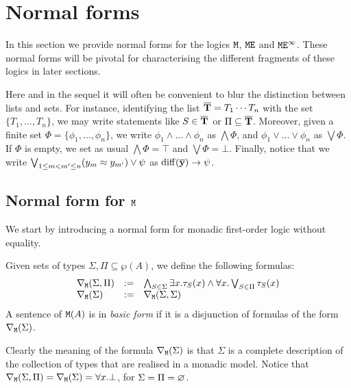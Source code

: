 
\section{Normal forms}
\label{sec:normalforms}

In this section we provide normal forms for the logics $\mathtt{M}$, $\mathtt{M}\mathtt{E}$ and 
$\mathtt{M}\mathtt{E}^{\infty}$. 
These normal forms will be pivotal for characterising the different fragments of 
these logics in later sections.
\begin{convention}
Here and in the sequel it will often be convenient to blur the distinction 
between lists and sets.
For instance, identifying the list $\overline{{\mathbf{T}}} = T_{1}\cdots T_{n}$ with the
set $\{ T_{1}, \ldots, T_{n} \}$, we may write statements like $S \in \overline{{\mathbf{T}}}$ 
or $\Pi \subseteq \overline{{\mathbf{T}}}$. 
Moreover, given a finite set $\Phi = \{\phi_1, \dots, \phi_n\}$, we write $\phi_1 \land \dots \land \phi_n$ as $\bigwedge \Phi$, and $\phi_1 \lor \dots \lor \phi_n$ as $\bigvee \Phi$. If $\Phi$ is empty, we set as usual $\bigwedge \Phi = \top$ and $\bigvee \Phi = \bot$.
Finally, notice that we write $\bigvee_{1\leq m < m^{\prime} \leq n} (y_m \approx y_{m^{\prime}}) \lor \psi$ as $\mathrm{diff}(\overline{{\mathbf{y}}}) \to \psi$. 
\end{convention}


\subsection{Normal form for $\mathtt{M}$}

We start by introducing a normal form for monadic first-order logic without 
equality.

\begin{definition}\label{def:bfofo}
Given sets of types $\Sigma, \Pi \subseteq \wp(A)$, we define the following 
formulas:
\[\begin{array}{lll}
   \nabla_{\mathtt{M}}(\Sigma,\Pi) &\mathrel{:=}&
   \bigwedge_{S\in\Sigma} \exists x. \tau_S(x) \land 
   \forall x. \bigvee_{S\in\Pi} \tau_S(x)
\\ \nabla_{\mathtt{M}}(\Sigma)      &\mathrel{:=}& \nabla_{\mathtt{M}}(\Sigma,\Sigma)
\end{array}\]
A sentence of $\mathtt{M}(A)$ is in \emph{basic form} if it is 
a disjunction of formulas of the form $\nabla_{\mathtt{M}}(\Sigma)$.
\end{definition}

Clearly the meaning of the formula $\nabla_{\mathtt{M}}(\Sigma)$ is that $\Sigma$ is a 
complete description of the collection of types that are realised in a monadic 
model. 
Notice that $  \nabla_{\mathtt{M}}(\Sigma,\Pi) = \nabla_{\mathtt{M}}(\Sigma) = \forall x. \bot$, for 
$\Sigma =\Pi = \varnothing$.

